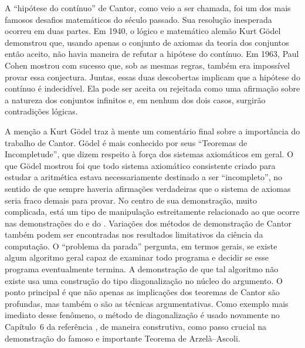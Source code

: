 A ``hipótese do contínuo'' de Cantor, como veio a ser chamada, foi um dos mais famosos desafios matemáticos do século passado. Sua resolução inesperada ocorreu em duas partes. Em 1940, o lógico e matemático alemão Kurt Gödel demonstrou que, usando apenas o conjunto de axiomas da teoria dos conjuntos então aceito, não havia maneira de refutar a hipótese do contínuo. Em 1963, Paul Cohen mostrou com sucesso que, sob as mesmas regras, também era impossível provar essa conjectura. Juntas, essas duas descobertas implicam que a hipótese do contínuo é indecidível. Ela pode ser aceita ou rejeitada como uma afirmação sobre a natureza dos conjuntos infinitos e, em nenhum dos dois casos, surgirão contradições lógicas. 

A menção a Kurt Gödel traz à mente um comentário final sobre a importância do trabalho de Cantor. Gödel é mais conhecido por seus ``Teoremas de Incompletude'', que dizem respeito à força dos sistemas axiomáticos em geral. O que Gödel mostrou foi que todo sistema axiomático consistente criado para estudar a aritmética estava necessariamente destinado a ser ``incompleto'', no sentido de que sempre haveria afirmações verdadeiras que o sistema de axiomas seria fraco demais para provar. No centro de sua demonstração, muito complicada, está um tipo de manipulação estreitamente relacionado ao que ocorre nas demonstrações do  e do . Variações dos métodos de demonstração de Cantor também podem ser encontradas nos resultados limitativos da ciência da computação. O ``problema da parada'' pergunta, em termos gerais, se existe algum algoritmo geral capaz de examinar todo programa e decidir se esse programa eventualmente termina. A demonstração de que tal algoritmo não existe usa uma construção do tipo diagonalização no núcleo do argumento. O ponto principal é que não apenas as implicações dos teoremas de Cantor são profundas, mas também o são as técnicas argumentativas. Como exemplo mais imediato desse fenômeno, o método de diagonalização é usado 
novamente no Capítulo~6 da referência \cite{MR3331079}, de maneira construtiva, 
como passo crucial na demonstração do famoso e importante Teorema de Arzelà--Ascoli. 
